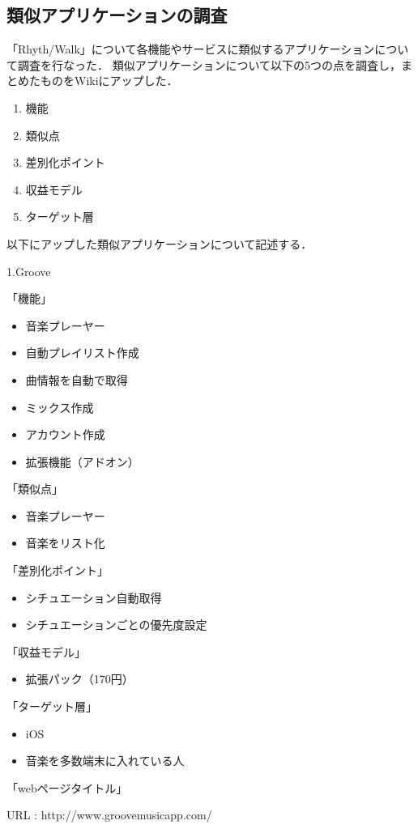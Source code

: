 \subsection{類似アプリケーションの調査}

\par 
 「Rhyth/Walk」について各機能やサービスに類似するアプリケーションについて調査を行なった．
類似アプリケーションについて以下の5つの点を調査し，まとめたものをWikiにアップした．
\begin{enumerate}
\item 機能
\item 類似点
\item 差別化ポイント
\item 収益モデル
\item ターゲット層
\end{enumerate}
\par
以下にアップした類似アプリケーションについて記述する．
\par
1.Groove
\par
「機能」
\begin{itemize}
\item 音楽プレーヤー
\item 自動プレイリスト作成
\item 曲情報を自動で取得
\item ミックス作成
\item アカウント作成
\item 拡張機能（アドオン）
\end{itemize}

「類似点」
\begin{itemize}
\item 音楽プレーヤー
\item 音楽をリスト化
\end{itemize}

「差別化ポイント」
\begin{itemize}
\item シチュエーション自動取得
\item シチュエーションごとの優先度設定
\end{itemize}

「収益モデル」
\begin{itemize}
\item 拡張パック（170円）
\end{itemize}

「ターゲット層」
\begin{itemize}
\item iOS
\item 音楽を多数端末に入れている人
\end{itemize}
「webページタイトル」
\par
URL : http://www.groovemusicapp.com/


